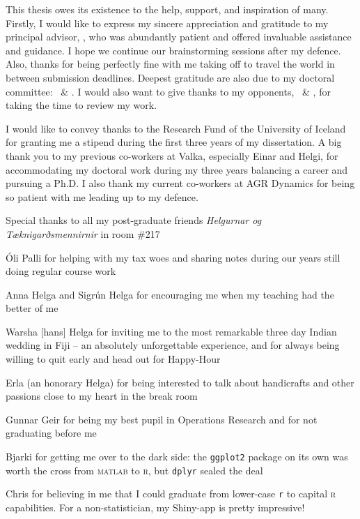 
\makeatletter 
This thesis owes its existence to the help, support, and inspiration of many. 
Firstly, I would like to express my sincere appreciation and gratitude to my 
principal advisor, \@advisor, who was abundantly patient and offered invaluable 
assistance and guidance. I hope we continue our brainstorming sessions after my 
defence. Also, thanks for being perfectly fine with me taking off to travel the 
world in between submission deadlines.
Deepest gratitude are also due to my doctoral committee: \@committeeA\ \& 
\@committeeB.
I would also want to give thanks to my opponents, \@opponentA\ \& \@opponentB, 
for taking the time to review my work.
\makeatother

I would like to convey thanks to the Research Fund of the University of 
Iceland for granting me a stipend during the first three years of my 
dissertation. 
A big thank you to my previous co-workers at Valka, especially Einar and Helgi, 
for accommodating my doctoral work during my three years balancing a 
career and pursuing a Ph.D.
I also thank my current co-workers at AGR Dynamics for being so patient with me 
leading up to my defence.

Special thanks to all my post-graduate friends \emph{Helgurnar og 
Tæknigarðsmennirnir} in room \#217
\begin{enumerate*}[label={{\!}}, after={{}}]
    \item Óli Palli for helping with my tax woes and sharing notes during our 
    years still doing regular course work
    \item Anna Helga and Sigrún Helga for encouraging me when my teaching had 
    the better of me
    \item Warsha [hans] Helga for inviting me to the most remarkable three day 
    Indian wedding in Fiji -- an absolutely unforgettable experience, and for 
    always being willing to quit early and head out for Happy-Hour
    \item Erla (an honorary Helga) for being interested to talk about 
    handicrafts and other passions close to my heart in the break room
    \item Gunnar Geir for being my best pupil in Operations Research and for 
    not graduating before me
    \item Bjarki for getting me over to the dark side: 
    the \texttt{ggplot2} package on its own was worth the cross from 
    \textsc{matlab} to \textsc{r}, but \texttt{dplyr} sealed the deal
    \item Chris for believing in me that I could graduate from lower-case 
    \texttt{r} to capital \textsc{r} capabilities. For a non-statistician, my 
    Shiny-app is pretty impressive!
\end{enumerate*}

